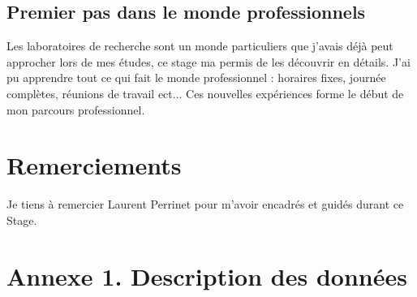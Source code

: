 \documentclass[11pt,francais]{article}
\begin{document}
\subsection{Premier pas dans le monde professionnels}
Les laboratoires de recherche sont un monde particuliers que j'avais déjà peut approcher lors de mes études, ce stage ma permis de les découvrir en détails. J'ai pu apprendre tout ce qui fait le monde professionnel : horaires fixes, journée complètes, réunions de travail ect...
Ces nouvelles expériences forme le début de mon parcours professionnel.

\newpage


\section*{Remerciements}
Je tiens à remercier Laurent Perrinet pour m'avoir encadrés et guidés durant ce Stage.



\newpage
\section*{Annexe 1. Description des données}

\end{document}
